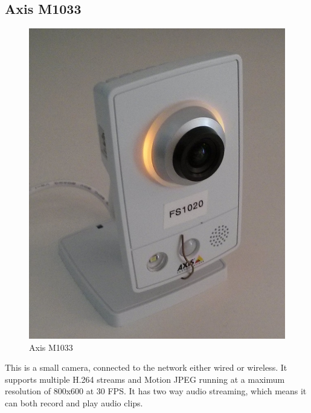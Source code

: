 \documentclass[nobiblatex]{LTHthesis}
\begin{document}
\subsection{Axis M1033}
\begin{figure}
    \centering
    \includegraphics[width=\textwidth]{m1033}
    \caption{Axis M1033}
    \label{fig:M1033}
\end{figure}
This is a small camera, connected to the network either wired or wireless. It supports multiple H.264 streams and Motion JPEG running at a maximum resolution of 800x600 at 30 FPS. It has two way audio streaming, which means it can both record and play audio clips.
\end{document}
